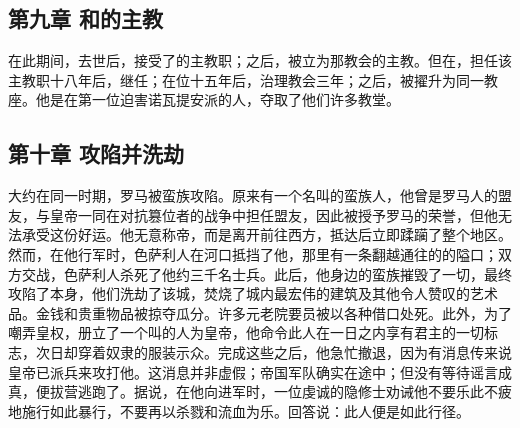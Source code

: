 
\subsection{第九章 和的主教}

在此期间，去世后，接受了的主教职；之后，被立为那教会的主教。但在，担任该主教职十八年后，继任；在位十五年后，治理教会三年；之后，被擢升为同一教座。他是在第一位迫害诺瓦提安派的人，夺取了他们许多教堂。\par


\subsection{第十章 攻陷并洗劫}

大约在同一时期，罗马被蛮族攻陷。原来有一个名叫的蛮族人，他曾是罗马人的盟友，与皇帝一同在对抗篡位者的战争中担任盟友，因此被授予罗马的荣誉，但他无法承受这份好运。他无意称帝，而是离开前往西方，抵达后立即蹂躏了整个地区。然而，在他行军时，色萨利人在河口抵挡了他，那里有一条翻越通往的的隘口；双方交战，色萨利人杀死了他约三千名士兵。此后，他身边的蛮族摧毁了一切，最终攻陷了本身，他们洗劫了该城，焚烧了城内最宏伟的建筑及其他令人赞叹的艺术品。金钱和贵重物品被掠夺瓜分。许多元老院要员被以各种借口处死。此外，为了嘲弄皇权，册立了一个叫的人为皇帝，他命令此人在一日之内享有君主的一切标志，次日却穿着奴隶的服装示众。完成这些之后，他急忙撤退，因为有消息传来说皇帝已派兵来攻打他。这消息并非虚假；帝国军队确实在途中；但没有等待谣言成真，便拔营逃跑了。据说，在他向进军时，一位虔诚的隐修士劝诫他不要乐此不疲地施行如此暴行，不要再以杀戮和流血为乐。回答说：此人便是如此行径。\par


